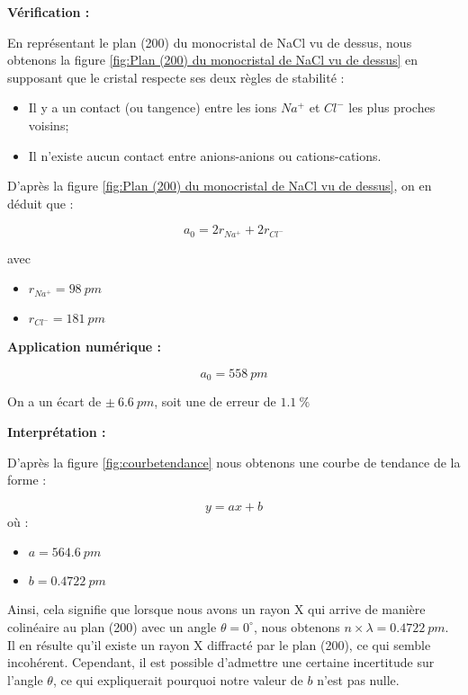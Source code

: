 \begin{flushleft}
	\vspace{-2cm}
\textbf{Vérification :}

En représentant le plan (200) du monocristal de NaCl vu de dessus, nous obtenons la figure \ref{fig:Plan (200) du monocristal de NaCl vu de dessus} en supposant que le cristal respecte ses deux règles de stabilité :

\begin{itemize}
	\item Il y a un contact (ou tangence) entre les ions $Na^+$ et $Cl^-$ les plus proches voisins;
	\item Il n'existe aucun contact entre anions-anions ou cations-cations.
\end{itemize}
	
 


	
	
	D'après la figure \ref{fig:Plan (200) du monocristal de NaCl vu de dessus}, on en déduit que :
	
	\begin{equation}
		a_0 = 2r_{Na^+}+2r_{Cl^-}
	\end{equation}

avec 
\begin{itemize}
	\item $r_{Na^+}= 98 \ pm$
	\item $r_{Cl^-}= 181 \ pm $	
\end{itemize}


\vspace{0.2cm}
\textbf{Application numérique :}
	
	\begin{equation}
		a_0 = 558 \ pm
	\end{equation}
	
On a un écart de $ \pm \ 6.6\  pm$,  soit une de erreur de $1.1 \ \%$

\textbf{Interprétation :}

D'après la figure \ref{fig:courbetendance} nous obtenons une courbe de tendance de la forme :

\begin{equation}
	y=a x + b
\end{equation}
où :
\begin{itemize}
	\item $a =564.6 \ pm$ 
	\item $b = 0.4722 \ pm$
\end{itemize}
\vspace{0.2cm}
Ainsi, cela signifie que lorsque nous avons un rayon X qui arrive de manière colinéaire au plan (200) avec un angle $\theta = 0^\circ$, nous obtenons $n \times \lambda = 0.4722 \ pm$. Il en résulte qu'il existe un rayon X diffracté par le plan (200), ce qui semble incohérent. Cependant, il est possible d'admettre une certaine incertitude sur l'angle $\theta$, ce qui expliquerait pourquoi notre valeur de $b$ n'est pas nulle.




\end{flushleft}
